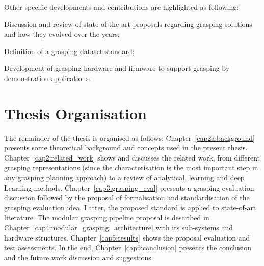 Other specific developments and contributions are highlighted as following:

\begin{itemize_jp}
    \item Discussion and review of state-of-the-art proposals regarding grasping solutions and how they evolved over the years; 
    \item Definition of a grasping dataset standard;
    \item Development of grasping hardware and firmware to support grasping by demonstration applications.
\end{itemize_jp}


\section{Thesis Organisation}


The remainder of the thesis is organised as follows: Chapter~\ref{cap2a:background} presents some theoretical background and concepts used in the present thesis. Chapter~\ref{cap2:related_work} shows and discusses the related work, from different grasping representations (since the characterisation is the most important step in any grasping planning approach) to a review of analytical, learning and deep Learning methods. Chapter~\ref{cap3:grasping_eval} presents a grasping evaluation discussion followed by the proposal of formalisation and standardisation of the grasping evaluation idea. Latter, the proposed standard is applied to state-of-art literature. The modular grasping pipeline proposal is described in Chapter~\ref{cap4:modular_grasping_architecture} with its sub-systems and hardware structures. Chapter~\ref{cap5:results} shows the proposal evaluation and test assessments. In the end, Chapter~\ref{cap6:conclusion} presents the conclusion and the future work discussion and suggestions.
 

